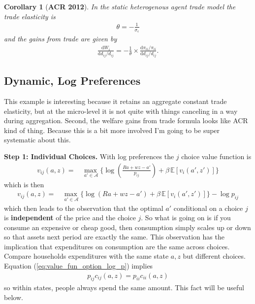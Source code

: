 \documentclass[12pt,pdftex]{article}
\newtheorem{corr}{Corollary}
\begin{document}
\begin{onehalfspacing}
\begin{corr}[\textbf{ACR 2012}] In the static heterogenous agent trade model the trade elasticity is
\begin{align}
\theta = -\frac{1}{\sigma_{\epsilon}} \nonumber
\end{align}
and the gains from trade are given by
\begin{align}
\frac{\mathrm{d} W_{i}}{\mathrm{d} d_{ij} / d_{ij}} = -\frac{1}{\theta} \times \frac{\mathrm{d} \pi_{ii} / \pi_{ii}}{\mathrm{d}d_{ij} / d_{ij}}.
\end{align}
\end{corr}

\subsection{Dynamic, Log Preferences}

This example is interesting because it retains an aggregate constant trade elasticity, but at the micro-level it is not quite with things canceling in a way during aggregation. Second, the welfare gains from trade formula looks like ACR kind of thing. Because this is a bit more involved I'm going to be super systematic about this. 

\textbf{Step 1: Individual Choices.} With log preferences the $j$ choice value function is
\begin{align}
v_{ij}(a, z) = &  \max_{\ a' \in \mathcal{A} }\bigg  \{ \log\left (\frac{Ra + wz - a'}{p_{ij}} \right )  + \beta \, \mathbb{E} [v_{i}(a', z')]  \bigg\}
\end{align}
which is then
\begin{align}
v_{ij}(a, z) = &  \max_{\ a' \in \mathcal{A} }\bigg  \{ \log(Ra + wz - a' )  + \beta \, \mathbb{E} [v_{i}(a', z' )]  \bigg\} - \log p_{ij}
\label{eq:value_fun_option_log_p}
\end{align}
which then leads to the observation that the optimal $a'$ conditional on a choice $j$ is \textbf{independent} of the price and the choice $j$. So what is going on is if you consume an expensive or cheap good, then consumption simply scales up or down so that assets next period are exactly the same. This observation has the implication that expenditures on consumption are the same across choices. Compare households expenditures with the same state $a,z$ but different choices. Equation (\ref{eq:value_fun_option_log_p}) implies
\begin{align}
p_{ij}c_{ij}(a,z) = p_{ii}c_{ii}(a,z)
\label{eq:apx-same-spending}
\end{align}
so within states, people always spend the same amount. This fact will be useful below.


\end{onehalfspacing}
\end{document}
